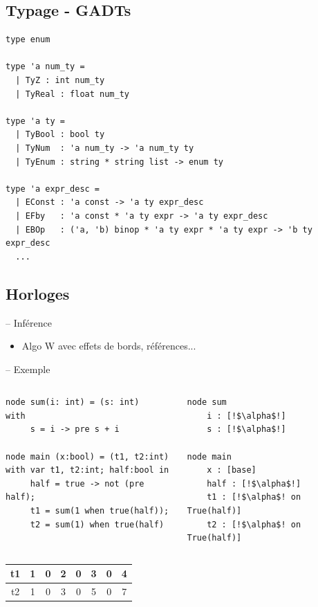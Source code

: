 \documentclass[11pt,usenames,dvipsnames]{beamer}
\begin{document}
\subsection{Typage - GADTs}
\begin{frame}[fragile]{\null}
  \begin{lstlisting}[language=caml]
type enum

type 'a num_ty =
  | TyZ : int num_ty
  | TyReal : float num_ty

type 'a ty =
  | TyBool : bool ty
  | TyNum  : 'a num_ty -> 'a num_ty ty
  | TyEnum : string * string list -> enum ty

type 'a expr_desc =
  | EConst : 'a const -> 'a ty expr_desc
  | EFby   : 'a const * 'a ty expr -> 'a ty expr_desc
  | EBOp   : ('a, 'b) binop * 'a ty expr * 'a ty expr -> 'b ty expr_desc
  ...
  \end{lstlisting}
\end{frame}

\subsection{Horloges}
\begin{frame}[fragile]{-- Inférence}
  \begin{itemize}
  \item Algo W avec effets de bords, références...
  \end{itemize}
\end{frame}

\begin{frame}[fragile]{-- Exemple}
  \begin{columns}
    \begin{column}{0.5\textwidth}
      \begin{lstlisting}[language=minils]
node sum(i: int) = (s: int)
with
     s = i -> pre s + i

node main (x:bool) = (t1, t2:int)
with var t1, t2:int; half:bool in
     half = true -> not (pre half);
     t1 = sum(1 when true(half));
     t2 = sum(1) when true(half)
   \end{lstlisting}
 \end{column}
 \begin{column}{0.5\textwidth}
   \pause
   \begin{lstlisting}[escapechar=!]
node sum
    i : [!$\alpha$!]
    s : [!$\alpha$!]

node main
    x : [base]
    half : [!$\alpha$!]
    t1 : [!$\alpha$! on True(half)]
    t2 : [!$\alpha$! on True(half)]
  \end{lstlisting}
 \end{column}
\end{columns}
\pause
\begin{center}
  \begin{tabular}{|c|ccccccc|}
    \hline
    t1    & 1 & 0 & 2 & 0 & 3 & 0 & 4\\
    \hline
    t2    & 1 & 0 & 3 & 0 & 5 & 0 & 7\\
    \hline
  \end{tabular}
\end{center}
\end{frame}
\end{document}
